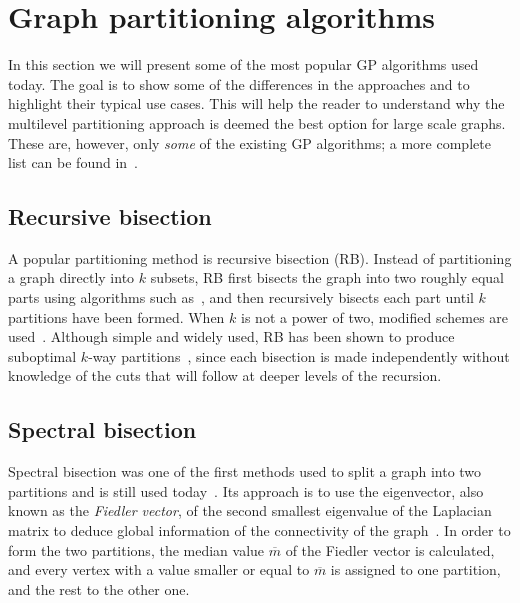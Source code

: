 \section{Graph partitioning algorithms} \label{graph_partitioning_algorithms}
In this section we will present some of the most popular GP algorithms used today. The goal is to show some of the differences in the approaches and to highlight their typical use cases. This will help the reader to understand why the multilevel partitioning approach is deemed the best option for large scale graphs. These are, however, only \textit{some} of the existing GP algorithms; a more complete list can be found in~\cite{buluc_recent_2016, 10.1145/3571808}. 

\subsection{Recursive bisection} \label{recursive_bisection}
A popular partitioning method is recursive bisection (RB). Instead of partitioning a graph directly into $k$ subsets, RB first bisects the graph into two roughly equal parts using algorithms such as~\cite{barnard_spectral_bisection, fiduccia_fm, Kernighan_kl}, and then recursively bisects each part until $k$ partitions have been formed. When $k$ is not a power of two, modified schemes are used~\cite{simon_recursive_bisection, chan_spectralkway, KarypisGeorge1998AFaH, hendrickson_multilevel_1995}. Although simple and widely used, RB has been shown to produce suboptimal $k$-way partitions~\cite{simon_recursive_bisection}, since each bisection is made independently without knowledge of the cuts that will follow at deeper levels of the recursion. 

\subsection{Spectral bisection}
Spectral bisection was one of the first methods used to split a graph into two partitions and is still used today~\cite{buluc_recent_2016}. Its approach is to use the eigenvector, also known as the \textit{Fiedler vector}, of the second smallest eigenvalue of the Laplacian matrix to deduce global information of the connectivity of the graph~\cite{fiedler_eigenvector}. In order to form the two partitions, the median value $\overline{m}$ of the Fiedler vector is calculated, and every vertex with a value smaller or equal to $\overline{m}$ is assigned to one partition, and the rest to the other one.

